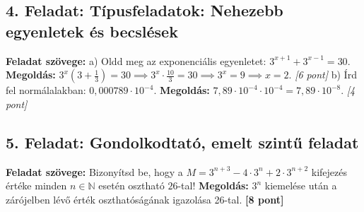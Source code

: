 \documentclass[11pt,a4paper]{article}
\begin{document}
\subsection*{4. Feladat: Típusfeladatok: Nehezebb egyenletek és becslések}
\textbf{Feladat szövege:} 
a) Oldd meg az exponenciális egyenletet: $3^{x+1} + 3^{x-1} = 30$.
\newline\textbf{Megoldás:} $3^x(3 + \frac{1}{3}) = 30 \implies 3^x \cdot \frac{10}{3} = 30 \implies 3^x = 9 \implies x = 2$. \hfill \textit{[6 pont]}
\newline b) Írd fel normálalakban: $0{,}000789 \cdot 10^{-4}$.
\newline\textbf{Megoldás:} $7{,}89 \cdot 10^{-4} \cdot 10^{-4} = 7{,}89 \cdot 10^{-8}$. \hfill \textit{[4 pont]}

\subsection*{5. Feladat: Gondolkodtató, emelt szintű feladat}
\textbf{Feladat szövege:} Bizonyítsd be, hogy a $M = 3^{n+3} - 4 \cdot 3^n + 2 \cdot 3^{n+2}$ kifejezés értéke minden $n \in \mathbb{N}$ esetén osztható $26$-tal!
\newline\textbf{Megoldás:} $3^n$ kiemelése után a zárójelben lévő érték oszthatóságának igazolása 26-tal. \hfill \textbf{[8 pont]}
\end{document}
